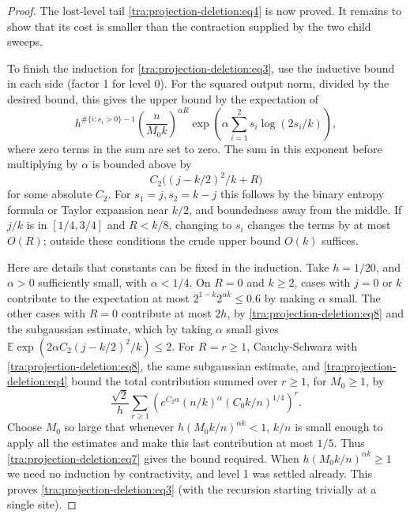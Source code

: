 \begin{proof}
The lost-level tail \eqref{tra:projection-deletion:eq4} is now proved. It remains to show that its cost is smaller than the contraction supplied by the two child sweeps.

To finish the induction for \eqref{tra:projection-deletion:eq3}, use the inductive bound in each side (factor 1 for level 0). For the squared output norm, divided by the desired bound, this gives the upper bound by the expectation of
\begin{equation}
h^{\#\{i:s_i>0\}-1}
\left(\frac{n}{M_0 k}\right)^{\alpha R}
\exp\left(\alpha\sum_{i=1}^2 s_i\log(2s_i/k)\right),
\label{tra:projection-deletion:eq7}
\end{equation}
where zero terms in the sum are set to zero. The sum in this exponent before multiplying by \(\alpha\) is bounded above by
\begin{equation}
C_2\big((j-k/2)^2/k+R\big)
\label{tra:projection-deletion:eq8}
\end{equation}
for some absolute \(C_2\). For \(s_1=j,s_2=k-j\) this follows by the binary entropy formula or Taylor expansion near \(k/2\), and boundedness away from the middle. If \(j/k\) is in \([1/4,3/4]\) and \(R< k/8\), changing to \(s_i\) changes the terms by at most \(O(R)\); outside these conditions the crude upper bound \(O(k)\) suffices.

Here are details that constants can be fixed in the induction. Take \(h=1/20\), and \(\alpha>0\) sufficiently small, with \(\alpha<1/4\). On \(R=0\) and \(k\ge2\), cases with \(j=0\) or \(k\) contribute to the expectation at most \(2^{1-k}2^{\alpha k}\le 0.6\) by making \(\alpha\) small. The other cases with \(R=0\) contribute at most \(2h\), by \eqref{tra:projection-deletion:eq8} and the subgaussian estimate, which by taking \(\alpha\) small gives \(\mathbb E \exp(2\alpha C_2(j-k/2)^2/k)\le 2\). For \(R=r\ge1\), Cauchy-Schwarz with \eqref{tra:projection-deletion:eq8}, the same subgaussian estimate, and \eqref{tra:projection-deletion:eq4} bound the total contribution summed over \(r\ge1\), for \(M_0\ge1\), by
\[
\frac{\sqrt 2}{h}\sum_{r\ge1}
\left(e^{C_2\alpha}(n/k)^\alpha (C_0 k/n)^{1/4}\right)^r.
\]
Choose \(M_0\) so large that whenever \(h(M_0 k/n)^{\alpha k}<1\), \(k/n\) is small enough to apply all the estimates and make this last contribution at most \(1/5\). Thus \eqref{tra:projection-deletion:eq7} gives the bound required. When \(h(M_0 k/n)^{\alpha k}\ge1\) we need no induction by contractivity, and level 1 was settled already. This proves \eqref{tra:projection-deletion:eq3} (with the recursion starting trivially at a single site).
\end{proof}
